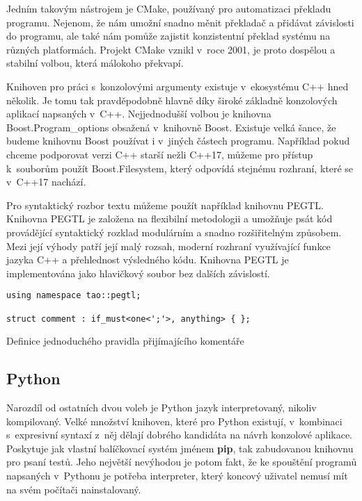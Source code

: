 Jedním takovým nástrojem je CMake\cite{cmake-overview}, používaný pro automatizaci překladu programu. Nejenom, že nám umožní snadno měnit překladač a přidávat závislosti do programu, ale také nám pomůže zajistit konzistentní překlad systému na různých platformách. Projekt CMake vznikl v~roce 2001\cite{cmake-overview}, je proto dospělou a stabilní volbou, která málokoho překvapí.

Knihoven pro práci s~konzolovými argumenty existuje v~ekosystému C++ hned několik. Je tomu tak pravděpodobně hlavně díky široké základně konzolových aplikací napsaných v~C++. Nejjednodušší volbou je knihovna Boost.Program\_options obsažená v~knihovně Boost\cite{boost-filesystem}. Existuje velká šance, že budeme knihovnu Boost používat i v~jiných částech programu. Například  pokud chceme podporovat verzi C++ starší nežli C++17\cite{cpp-filesystem}, můžeme pro přístup k~souborům použít Boost.Filesystem, který odpovídá stejnému rozhraní, které se v~C++17 nachází\cite{boost-filesystem}.

Pro syntaktický rozbor textu můžeme použít například knihovnu PEGTL\cite{github-pegtl}. Knihovna PEGTL je založena na flexibilní metodologii a umožňuje psát kód provádějící syntaktický rozklad modulárním a snadno rozšiřitelným způsobem. Mezi její výhody patří její malý rozsah, moderní rozhraní využívající funkce jazyka C++ a přehlednost výsledného kódu. Knihovna PEGTL je implementována jako hlavičkový soubor bez dalších závislostí\cite{github-pegtl}.


\begin{listing}
\begin{verbatim}
using namespace tao::pegtl;

struct comment : if_must<one<';'>, anything> { };
\end{verbatim}
\caption{Definice jednoduchého pravidla přijímajícího komentáře}
\label{fig:peg-example}
\end{listing}

\subsection{Python}

Narozdíl od ostatních dvou voleb je Python jazyk interpretovaný, nikoliv kompilovaný. Velké množství knihoven, které pro Python existují, v~kombinaci s~expresivní syntaxí z~něj dělají dobrého kandidáta na návrh konzolové aplikace. Poskytuje jak vlastní balíčkovací systém jménem \textbf{pip}\cite{pip}, tak zabudovanou knihovnu pro psaní testů\cite{python-unittest}. Jeho největší nevýhodou je potom fakt, že ke spouštění programů napsaných v~Pythonu je potřeba interpreter, který koncový uživatel nemusí mít na svém počítači nainstalovaný.

